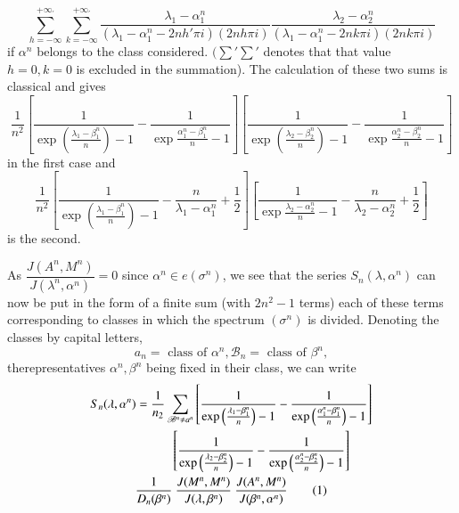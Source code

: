 $$
\sum_{h = - \infty}^{+ \infty_{'}} \sum_{k = - \infty}^{+ \infty_{'}}
\frac{\lambda_1 - \alpha^n_1}{(\lambda_1- \alpha^n_1 - 2nh' \pi i)(2nh
  \pi i)} \frac{\lambda_2 - \alpha^n_2}{(\lambda_1- \alpha^n_1 - 2nk
  \pi i)(2nk \pi i)} 
$$
if $\alpha^n$ belongs to the class considered. $(\sum' \sum'$ denotes
that that value $h= 0, k= 0$ is excluded in the summation). The
calculation of these two sums is classical and gives  
$$
\frac{1}{n^2} \left[\frac{1}{\exp \left(\frac{\lambda_1 -
      \beta^n_1}{n}\right)-1} 
  - \frac{1}{\exp \frac{\alpha^n_1 - \beta^n_1}{n}-1}\right] \left[
  \frac{1}{\exp \left(\frac{\lambda_2 - \beta^n_2}{n}\right) -1} - \frac{1}{\exp
    \frac{\alpha^n_2 - \beta^n_2}{n} -1}\right] 
$$
in the first case and  
$$
\frac{1}{n^2} \left[ \frac{1}{\exp \left(\frac{\lambda_1 - \beta^n_1}{n}\right)
    -1} - \frac{n}{\lambda_1 - \alpha^n_1} + \frac{1}{2}\right] \left[
  \frac{1}{\exp\frac{\lambda_2 - \alpha^n_{2}}{n}-1} -
  \frac{n}{\lambda_2 - \alpha^n_2} + \frac{1}{2} \right] 
$$
is the second.

As $\dfrac{J(A^n,M^n)}{J(\lambda^n,\alpha^n)} = 0$ since $\alpha^n \in
e (\sigma^n)$, we see that the series $S_n(\lambda, \alpha^n)$ can now
be put in the form of a finite sum (with $2n^2 -1$ terms) each of
these terms corresponding to classes in which the spectrum
$(\sigma^n)$ is divided. Denoting the classes by capital letters, 
$$
a_n = \text{ class  of } \alpha^n, \mathscr{B}_n = \text{ class of } \beta^n,
$$
the\pageoriginale representatives $\alpha^n,\beta^n$ being fixed in their class, we
can write 
\begin{multline*}
S_n(\lambda,\alpha^n) = \frac{1}{n_2} \sum_{\mathscr{B}^n \neq a^n}
\left[ \frac{1}{\exp \left(\frac{\lambda_1 - \beta^n_1}{n}\right) -1}
  -\frac{1}{\exp\left(\frac{\alpha^n_1 - \beta^n_1}{n}\right)-1}\right]\\ 
  \hspace{1.7cm}\left[ \frac{1}{\exp\left(\frac{\lambda_2 -
        \beta^n_2}{n}\right)-1}
    -\frac{1}{\exp \left(\frac{\alpha^n_2 -
        \beta^n_2}{n}\right)-1}\right]\\ 
  \frac{1}{D_n(\beta^n)} ~ \frac{ J(M^n,M^n)}{J(\lambda,\beta^n )}
  ~\frac{J(A^n,M^n)}{J(\beta^n, \alpha^n)} \tag{1}
\end{multline*}


